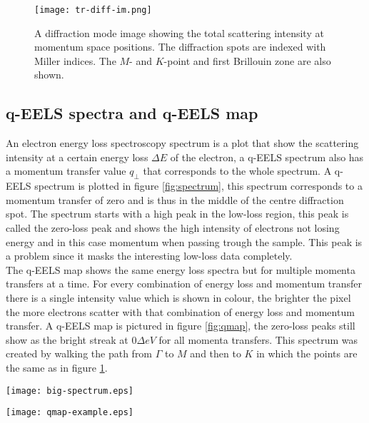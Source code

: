 \begin{figure}
	\centering
	\texttt{[image: tr-diff-im.png]}
	\caption{A diffraction mode image showing the total scattering intensity at momentum space positions. The diffraction spots are indexed with Miller indices. The $M$- and $K$-point and first Brillouin zone are also shown.}
	\label{fig:tr-diff-im}
\end{figure}



\subsection{q-EELS spectra and q-EELS map}
An electron energy loss spectroscopy spectrum is a plot that show the scattering intensity at a certain energy loss $\Delta E$ of the electron, a q-EELS spectrum also has a momentum transfer value $q_{\perp}$ that corresponds to the whole spectrum. A q-EELS spectrum is plotted in figure \ref{fig:spectrum}, this spectrum corresponds to a momentum transfer of zero and is thus in the middle of the centre diffraction spot. The spectrum starts with a high peak in the low-loss region, this peak is called the zero-loss peak and shows the high intensity of electrons not losing energy and in this case momentum when passing trough the sample. This peak is a problem since it masks the interesting low-loss data completely.\\
The q-EELS map shows the same energy loss spectra but for multiple momenta transfers at a time. For every combination of energy loss and momentum transfer there is a single intensity value which is shown in colour, the brighter the pixel the more electrons scatter with that combination of energy loss and momentum transfer. A q-EELS map is pictured in figure \ref{fig:qmap}, the zero-loss peaks still show as the bright streak at $0 \Delta eV$ for all momenta transfers. This spectrum was created by walking the path from $\Gamma$ to $M$ and then to $K$ in which the points are the same as in figure \ref{fig:tr-diff-im}.

\begin{minipage}{.45\textwidth}
	\centering
	\texttt{[image: big-spectrum.eps]}
	\label{fig:spectrum}
\end{minipage}%
\begin{minipage}{.45\textwidth}
	\centering
	\texttt{[image: qmap-example.eps]}
	\label{fig:qmap}
\end{minipage}

